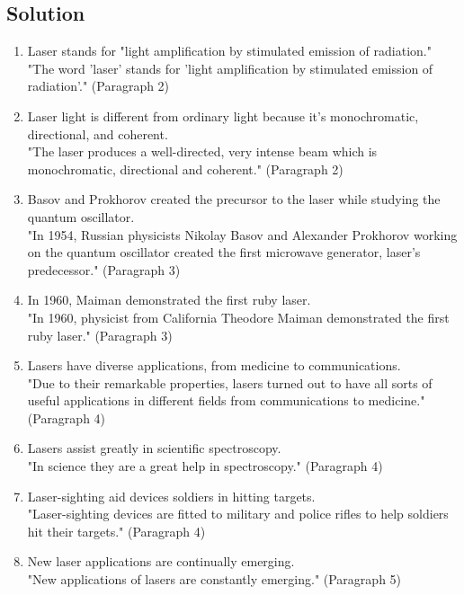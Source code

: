 \subsection*{Solution}
\begin{enumerate}
      \item Laser stands for "light amplification by stimulated emission of radiation." \\
            "The word 'laser' stands for 'light amplification by stimulated emission
            of radiation'." (Paragraph 2)
      \item Laser light is different from ordinary light because it's monochromatic,
            directional, and coherent. \\
            "The laser produces a well-directed, very intense beam which is monochromatic,
            directional and coherent." (Paragraph 2)
      \item Basov and Prokhorov created the precursor to the laser while studying the
            quantum oscillator. \\
            "In 1954, Russian physicists Nikolay Basov and Alexander Prokhorov working
            on the quantum oscillator created the first microwave generator, laser’s
            predecessor." (Paragraph 3)
      \item In 1960, Maiman demonstrated the first ruby laser. \\
            "In 1960, physicist from California Theodore Maiman demonstrated the first
            ruby laser." (Paragraph 3)
      \item Lasers have diverse applications, from medicine to communications. \\
            "Due to their remarkable properties, lasers turned out to have all sorts
            of useful applications in different fields from communications to medicine."
            (Paragraph 4)
      \item Lasers assist greatly in scientific spectroscopy. \\
            "In science they are a great help in spectroscopy." (Paragraph 4)
      \item Laser-sighting aid devices soldiers in hitting targets. \\
            "Laser-sighting devices are fitted to military and police rifles to help
            soldiers hit their targets." (Paragraph 4)
      \item New laser applications are continually emerging. \\
            "New applications of lasers are constantly emerging." (Paragraph 5)

\end{enumerate}
